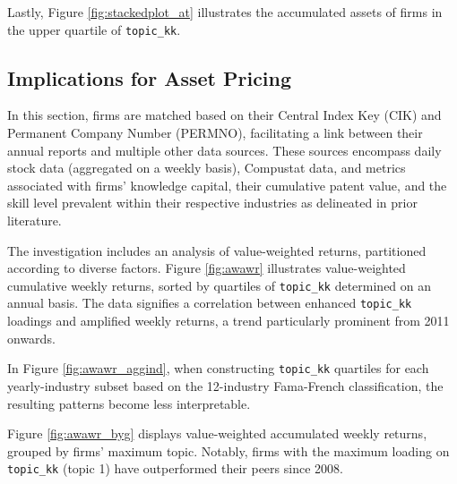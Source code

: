 \documentclass[12pt, letterpaper]{article}
\begin{document}

Lastly, Figure \ref{fig:stackedplot_at} illustrates the accumulated assets of firms in the upper quartile of \texttt{topic\_kk}.


\subsection{Implications for Asset Pricing}

In this section, firms are matched based on their Central Index Key (CIK) and Permanent Company Number (PERMNO), facilitating a link between their annual reports and multiple other data sources. These sources encompass daily stock data (aggregated on a weekly basis), Compustat data, and metrics associated with firms' knowledge capital, their cumulative patent value, and the skill level prevalent within their respective industries as delineated in prior literature.

The investigation includes an analysis of value-weighted returns, partitioned according to diverse factors. Figure \ref{fig:awawr} illustrates value-weighted cumulative weekly returns, sorted by quartiles of \texttt{topic\_kk} determined on an annual basis. The data signifies a correlation between enhanced \texttt{topic\_kk} loadings and amplified weekly returns, a trend particularly prominent from 2011 onwards.


In Figure \ref{fig:awawr_aggind}, when constructing \texttt{topic\_kk} quartiles for each yearly-industry subset based on the 12-industry Fama-French classification, the resulting patterns become less interpretable.


Figure \ref{fig:awawr_byg} displays value-weighted accumulated weekly returns, grouped by firms' maximum topic. Notably, firms with the maximum loading on \texttt{topic\_kk} (topic 1) have outperformed their peers since 2008.
\end{document}
